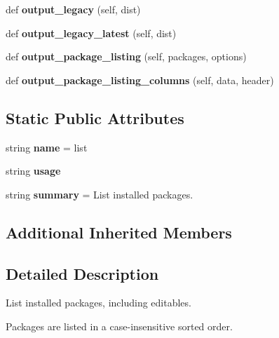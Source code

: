 \begin{DoxyCompactItemize}
\item 
\mbox{\label{classpip_1_1commands_1_1list_1_1_list_command_ab911822cc0bc8588f318677c0459649f}} 
def {\bfseries output\+\_\+legacy} (self, dist)
\item 
\mbox{\label{classpip_1_1commands_1_1list_1_1_list_command_a5c794acb813c979e611e221b8ee266c9}} 
def {\bfseries output\+\_\+legacy\+\_\+latest} (self, dist)
\item 
\mbox{\label{classpip_1_1commands_1_1list_1_1_list_command_a6c0da1f0372cfa1121972217c9da9174}} 
def {\bfseries output\+\_\+package\+\_\+listing} (self, packages, options)
\item 
\mbox{\label{classpip_1_1commands_1_1list_1_1_list_command_af984ab03467bedcf815e9fce95d5fd17}} 
def {\bfseries output\+\_\+package\+\_\+listing\+\_\+columns} (self, data, header)
\end{DoxyCompactItemize}
\subsection*{Static Public Attributes}
\begin{DoxyCompactItemize}
\item 
\mbox{\label{classpip_1_1commands_1_1list_1_1_list_command_a6a6edf6b81051f9649c0f56d42004128}} 
string {\bfseries name} = \textquotesingle{}list\textquotesingle{}
\item 
string {\bfseries usage}
\item 
\mbox{\label{classpip_1_1commands_1_1list_1_1_list_command_af6c7b78b8faf2c7d6d42a43ce3306e5c}} 
string {\bfseries summary} = \textquotesingle{}List installed packages.\textquotesingle{}
\end{DoxyCompactItemize}
\subsection*{Additional Inherited Members}


\subsection{Detailed Description}
\begin{DoxyVerb}List installed packages, including editables.

Packages are listed in a case-insensitive sorted order.
\end{DoxyVerb}
 

